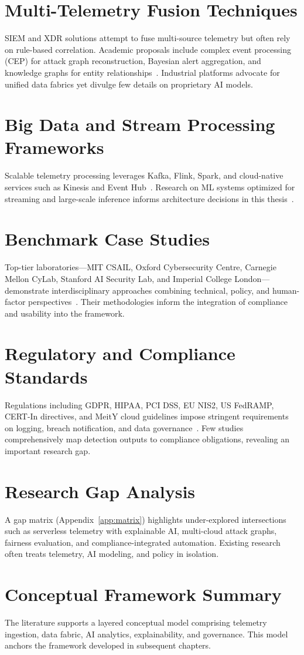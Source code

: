 \section{Multi-Telemetry Fusion Techniques}
SIEM and XDR solutions attempt to fuse multi-source telemetry but often rely on rule-based correlation. Academic proposals include complex event processing (CEP) for attack graph reconstruction, Bayesian alert aggregation, and knowledge graphs for entity relationships~\cite{albanese2017cep,mitrethreatgraph2023}. Industrial platforms advocate for unified data fabrics yet divulge few details on proprietary AI models.

\section{Big Data and Stream Processing Frameworks}
Scalable telemetry processing leverages Kafka, Flink, Spark, and cloud-native services such as Kinesis and Event Hub~\cite{zaharia2016apache,balaji2021flink}. Research on ML systems optimized for streaming and large-scale inference informs architecture decisions in this thesis~\cite{palkar2018weld}.

\section{Benchmark Case Studies}
Top-tier laboratories---MIT CSAIL, Oxford Cybersecurity Centre, Carnegie Mellon CyLab, Stanford AI Security Lab, and Imperial College London---demonstrate interdisciplinary approaches combining technical, policy, and human-factor perspectives~\cite{mitcsail2023,oxfordcyber2022,cylab2021}. Their methodologies inform the integration of compliance and usability into the framework.

\section{Regulatory and Compliance Standards}
Regulations including GDPR, HIPAA, PCI DSS, EU NIS2, US FedRAMP, CERT-In directives, and MeitY cloud guidelines impose stringent requirements on logging, breach notification, and data governance~\cite{gdpr2016,hipaa2013,nis22022,fedramp2023,certin2022directive,meity2017cloud}. Few studies comprehensively map detection outputs to compliance obligations, revealing an important research gap.

\section{Research Gap Analysis}
A gap matrix (Appendix~\ref{app:matrix}) highlights under-explored intersections such as serverless telemetry with explainable AI, multi-cloud attack graphs, fairness evaluation, and compliance-integrated automation. Existing research often treats telemetry, AI modeling, and policy in isolation.

\section{Conceptual Framework Summary}
The literature supports a layered conceptual model comprising telemetry ingestion, data fabric, AI analytics, explainability, and governance. This model anchors the framework developed in subsequent chapters.
